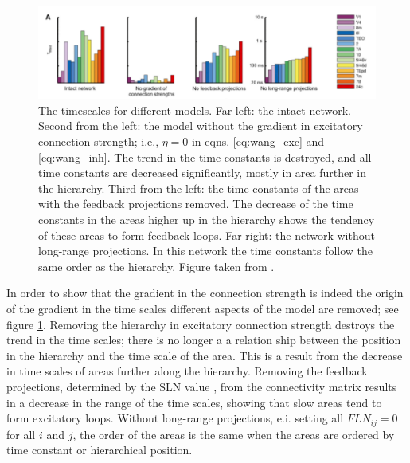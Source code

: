 \begin{figure}[!ht]
\centering
\includegraphics[scale=0.3]{wang_figures/time_consts}
\caption{The timescales for different models. Far left: the intact network. Second from the left: the model without the gradient in excitatory connection strength; i.e., $\eta=0$ in eqns. \ref{eq:wang_exc} and \ref{eq:wang_inh}. The trend in the time constants is destroyed, and all time constants are decreased significantly, mostly in area further in the hierarchy.
Third from the left: the time constants of the areas with the feedback projections removed. The decrease of the time constants in the areas higher up in the hierarchy shows the tendency of these areas to form feedback loops.
Far right: the network without long-range projections. In this network the time constants follow the same order as the hierarchy.
Figure taken from \cite{chaudhuri2015large-scale}.
}
\label{fig:wang_time_consts}
\end{figure}

In order to show that the gradient in the connection strength is indeed the origin of the gradient in the time scales  different aspects of the model are removed; see figure \ref{fig:wang_time_consts}.
Removing the hierarchy in excitatory connection strength destroys the trend in the time scales; there is no longer a a relation ship between the position in the hierarchy and the time scale of the area.
This is a result from  the decrease in time scales of areas further along the hierarchy.
Removing the feedback projections, determined by the SLN value \cite{felleman1991distributed}, from the connectivity matrix results in a decrease in the range of the time scales, showing that slow areas tend to form excitatory loops.
Without long-range projections, e.i. setting all $FLN_{ij}=0$ for all $i$ and $j$, the order of the areas is the same when the areas are ordered by time constant or hierarchical position.

